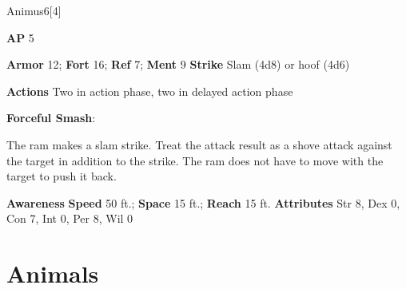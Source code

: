 \begin{monsection}[Ram]{Animus}{6}[4]
\vspace{-1em}\vspace{-1em}
\begin{spellcontent}
\begin{spelltargetinginfo}
{\textbf{AP} 5}

\pari \textbf{Armor} 12;
\textbf{Fort} 16;
\textbf{Ref} 7;
\textbf{Ment} 9
\pari \textbf{Strike} Slam  (4d8) or hoof  (4d6)


\pari \textbf{Actions} Two in action phase, two in delayed action phase
\end{spelltargetinginfo}


\begin{spelleffects}

\pari
\textbf{Forceful Smash}:

The ram makes a slam strike.
Treat the attack result as a shove attack against the target in addition to the strike.
The ram does not have to move with the target to push it back.




\end{spelleffects}

\end{spellcontent}

\begin{monsterfooter}
\pari \textbf{Awareness} 
\pari \textbf{Speed} 50 ft.;
\textbf{Space} 15 ft.;
\textbf{Reach} 15 ft.
\pari \textbf{Attributes}
Str 8,
Dex 0,
Con 7,
Int 0,
Per 8,
Wil 0
\end{monsterfooter}
\end{monsection}


\section{Animals}


